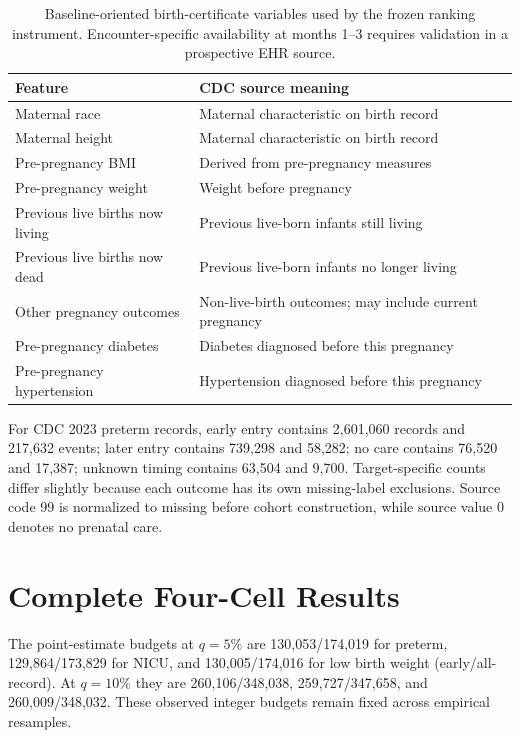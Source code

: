 \documentclass{article}
\begin{document}
\begin{table}[htbp]
  \centering
  \caption{Baseline-oriented birth-certificate variables used by the frozen
  ranking instrument. Encounter-specific availability at months 1--3 requires
  validation in a prospective EHR source.}
  \label{tab:features}
  \small
  \begin{tabular*}{\linewidth}{@{\extracolsep{\fill}}ll@{}}
    \toprule
    Feature & CDC source meaning \\
    \midrule
    Maternal race & Maternal characteristic on birth record \\
    Maternal height & Maternal characteristic on birth record \\
    Pre-pregnancy BMI & Derived from pre-pregnancy measures \\
    Pre-pregnancy weight & Weight before pregnancy \\
    Previous live births now living & Previous live-born infants still living \\
    Previous live births now dead & Previous live-born infants no longer living \\
    Other pregnancy outcomes & Non-live-birth outcomes; may include current pregnancy \\
    Pre-pregnancy diabetes & Diabetes diagnosed before this pregnancy \\
    Pre-pregnancy hypertension & Hypertension diagnosed before this pregnancy \\
    \bottomrule
  \end{tabular*}
\end{table}

For CDC 2023 preterm records, early entry contains 2,601,060 records and
217,632 events; later entry contains 739,298 and 58,282; no care contains
76,520 and 17,387; unknown timing contains 63,504 and 9,700. Target-specific
counts differ slightly because each outcome has its own missing-label
exclusions. Source code 99 is normalized to missing before cohort construction,
while source value 0 denotes no prenatal care.

\section{Complete Four-Cell Results}
\label{app:shapley}





The point-estimate budgets at $q=5\%$ are 130,053/174,019 for preterm,
129,864/173,829 for NICU, and 130,005/174,016 for low birth weight
(early/all-record). At $q=10\%$ they are 260,106/348,038, 259,727/347,658, and
260,009/348,032. These observed integer budgets remain fixed across empirical
resamples.
\end{document}
